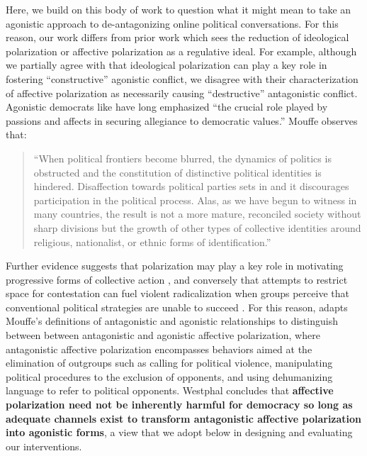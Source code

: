 Here, we build on this body of work to question what it might mean to take an agonistic approach to de-antagonizing online political conversations. For this reason, our work differs from prior work which sees the reduction of ideological polarization \cite{Tessleretal2024HabermasMachine} or affective polarization \cite{Strayetal2023AlgorithmicManagement, Strayetal2026ProsocialRrankingChallenge} as a regulative ideal. For example, although we partially agree with \citet{Strayetal2023AlgorithmicManagement} that ideological polarization can play a key role in fostering ``constructive'' agonistic conflict, we disagree with their characterization of affective polarization as necessarily causing ``destructive'' antagonistic conflict. Agonistic democrats like \citet{Mouffe2000DemocraticParadox} have long emphasized ``the crucial role played by passions and affects in securing allegiance to democratic values.'' Mouffe observes that:
\begin{quote}
    ``When political frontiers become blurred, the dynamics of politics is obstructed and the constitution of distinctive political identities is hindered. Disaffection towards political parties sets in and it discourages participation in the political process. Alas, as we have begun to witness in many countries, the result is not a more mature, reconciled society without sharp divisions but the growth of other types of collective identities around religious, nationalist, or ethnic forms of identification.''
\end{quote}
Further evidence suggests that polarization may play a key role in motivating progressive forms of collective action \cite{Smithetal2024PolarizationCollectiveEngagement}, and conversely that attempts to restrict space for contestation can fuel violent radicalization when groups perceive that conventional political strategies are unable to succeed \cite{Smithetal2025PrimerOnPoliticization}. For this reason, \citet{Westphal2025AffectivePolarization} adapts Mouffe's definitions of antagonistic and agonistic relationships to distinguish between between antagonistic and agonistic affective polarization, where antagonistic affective polarization encompasses behaviors aimed at the elimination of outgroups such as calling for political violence, manipulating political procedures to the exclusion of opponents, and using dehumanizing language to refer to political opponents. Westphal concludes that \textbf{affective polarization need not be inherently harmful for democracy so long as adequate channels exist to transform antagonistic affective polarization into agonistic forms}, a view that we adopt below in designing and evaluating our interventions.


